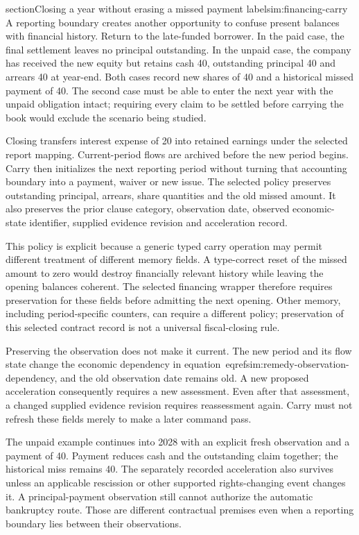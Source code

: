 
section{Closing a year without erasing a missed payment}
label{sim:financing-carry}
A reporting boundary creates another opportunity to confuse present balances
with financial history. Return to the late-funded borrower. In the paid case,
the final settlement leaves no principal outstanding. In the unpaid case,
the company has received the new equity but retains cash 40, outstanding
principal 40 and arrears 40 at year-end. Both cases record new shares of 40
and a historical missed payment of 40. The second case must be able to enter
the next year with the unpaid obligation intact; requiring every claim to be
settled before carrying the book would exclude the scenario being studied.

Closing transfers interest expense of 20 into retained earnings under the
selected report mapping. Current-period flows are archived before the new
period begins. Carry then initializes the next reporting period without
turning that accounting boundary into a payment, waiver or new issue. The
selected policy preserves outstanding principal, arrears, share quantities
and the old missed amount. It also preserves the prior clause category,
observation date, observed economic-state identifier, supplied evidence
revision and acceleration record.

This policy is explicit because a generic typed carry operation may permit
different treatment of different memory fields. A type-correct reset of the
missed amount to zero would destroy financially relevant history while leaving
the opening balances coherent. The selected financing wrapper therefore
requires preservation for these fields before admitting the next opening.
Other memory, including period-specific counters, can require a different
policy; preservation of this selected contract record is not a universal
fiscal-closing rule.

Preserving the observation does not make it current. The new period and its
flow state change the economic dependency in
equation~eqref{sim:remedy-observation-dependency}, and the old observation date
remains old. A new proposed acceleration consequently requires a new
assessment. Even after that assessment, a changed supplied evidence revision
requires reassessment again. Carry must not refresh these fields merely to
make a later command pass.

The unpaid example continues into 2028 with an explicit fresh observation
and a payment of 40. Payment reduces cash and the outstanding claim together;
the historical miss remains 40. The separately recorded acceleration also
survives unless an applicable rescission or other supported rights-changing
event changes it. A principal-payment observation still cannot authorize the
automatic bankruptcy route. Those are different contractual premises even
when a reporting boundary lies between their observations.

